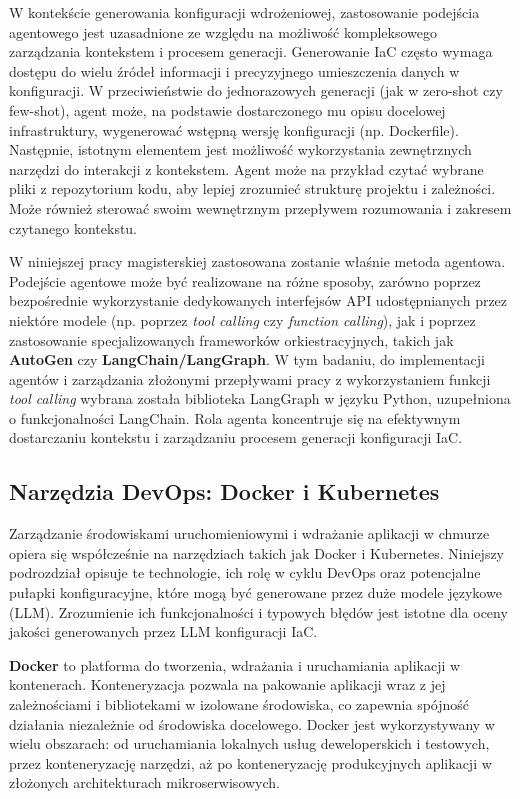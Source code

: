 W kontekście generowania konfiguracji wdrożeniowej, zastosowanie podejścia agentowego jest uzasadnione ze względu na możliwość kompleksowego zarządzania kontekstem i procesem generacji. Generowanie IaC często wymaga dostępu do wielu źródeł informacji i precyzyjnego umieszczenia danych w konfiguracji. W przeciwieństwie do jednorazowych generacji (jak w zero-shot czy few-shot), agent może, na podstawie dostarczonego mu opisu docelowej infrastruktury, wygenerować wstępną wersję konfiguracji (np. Dockerfile). Następnie, istotnym elementem jest możliwość wykorzystania zewnętrznych narzędzi do interakcji z kontekstem. Agent może na przykład czytać wybrane pliki z repozytorium kodu, aby lepiej zrozumieć strukturę projektu i zależności. Może również sterować swoim wewnętrznym przepływem rozumowania i zakresem czytanego kontekstu.

W niniejszej pracy magisterskiej zastosowana zostanie właśnie metoda agentowa. Podejście agentowe może być realizowane na różne sposoby, zarówno poprzez bezpośrednie wykorzystanie dedykowanych interfejsów API udostępnianych przez niektóre modele (np. poprzez \textit{tool calling} czy \textit{function calling}), jak i poprzez zastosowanie specjalizowanych frameworków orkiestracyjnych, takich jak \textbf{AutoGen} czy \textbf{LangChain/LangGraph}. W tym badaniu, do implementacji agentów i zarządzania złożonymi przepływami pracy z wykorzystaniem funkcji \textit{tool calling} wybrana została biblioteka LangGraph w języku Python, uzupełniona o funkcjonalności LangChain. Rola agenta koncentruje się na efektywnym dostarczaniu kontekstu i zarządzaniu procesem generacji konfiguracji IaC.

\subsection{Narzędzia DevOps: Docker i Kubernetes}

Zarządzanie środowiskami uruchomieniowymi i wdrażanie aplikacji w chmurze opiera się współcześnie na narzędziach takich jak Docker i Kubernetes. Niniejszy podrozdział opisuje te technologie, ich rolę w cyklu DevOps oraz potencjalne pułapki konfiguracyjne, które mogą być generowane przez duże modele językowe (LLM). Zrozumienie ich funkcjonalności i typowych błędów jest istotne dla oceny jakości generowanych przez LLM konfiguracji IaC.

\textbf{Docker} to platforma do tworzenia, wdrażania i uruchamiania aplikacji w kontenerach. Konteneryzacja pozwala na pakowanie aplikacji wraz z jej zależnościami i bibliotekami w izolowane środowiska, co zapewnia spójność działania niezależnie od środowiska docelowego. Docker jest wykorzystywany w wielu obszarach: od uruchamiania lokalnych usług deweloperskich i testowych, przez konteneryzację narzędzi, aż po konteneryzację produkcyjnych aplikacji w złożonych architekturach mikroserwisowych.

